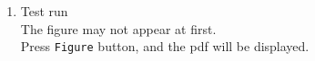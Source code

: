 \documentclass{article}
\begin{document}
\begin{enumerate}[\bf\large 1.]
\vspace{75mm}

\item Test run\\
\hspace*{10mm}The figure may not appear at first.\\
\hspace*{10mm}Press \verb|Figure| button, and the pdf will be displayed.


  \end{enumerate}
\end{document}
